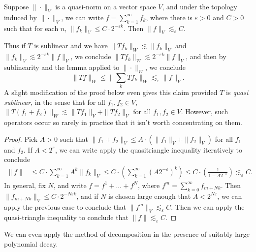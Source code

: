 \begin{lemma}
    Suppose $\| \cdot \|_V$ is a quasi-norm on a vector space $V$, and under the topology induced by $\| \cdot \|_V$, we can write $f = \sum_{k = 1}^\infty f_k$, where there is $\varepsilon > 0$ and $C > 0$ such that for each $n$, $\| f_k \|_V \leq C \cdot 2^{-\varepsilon k}$. Then $\| f \|_V \lesssim_\varepsilon C$.
\end{lemma}

\begin{remark}
	Thus if $T$ is sublinear and we have $\| Tf_k \|_W \lesssim \| f_k \|_V$ and $\| f_k \|_V \lesssim 2^{- \varepsilon k} \| f \|_V$, we conclude $\| Tf_k \|_W \lesssim 2^{-\varepsilon k} \| f \|_V$, and then by sublinearity and the lemma applied to $\| \cdot \|_W$, we conclude
	\[ \| Tf \|_W \leq \| \sum_k Tf_k \|_W \lesssim_\varepsilon \| f \|_V. \]
	A slight modification of the proof below even gives this claim provided $T$ is \emph{quasi sublinear}, in the sense that for all $f_1, f_2 \in V$, $\| T(f_1 + f_2) \|_W \lesssim \| Tf_1 \|_V + \| Tf_2 \|_V$ for all $f_1, f_2 \in V$. However, such operators occur so rarely in practice that it isn't worth concentrating on them.
\end{remark}

\begin{proof}
	Pick $A > 0$ such that $\| f_1 + f_2 \|_V \leq A \cdot (\| f_1 \|_V + \| f_2 \|_V)$ for all $f_1$ and $f_2$. If $A < 2^{\varepsilon}$, we can write apply the quasitriangle inequality iteratively to conclude
    \begin{align*}
        \| f \| &\leq C \cdot \sum_{k = 1}^\infty A^k \| f_k \|_V \leq C \cdot \left( \sum_{k = 1}^\infty (A 2^{-\varepsilon})^k \right) \leq C \cdot \left( \frac{1}{1 - A 2^{-\varepsilon}} \right) \lesssim_\varepsilon C.
    \end{align*}
    In general, fix $N$, and write $f = f^1 + \dots + f^N$, where $f^m = \sum_{k = 0}^\infty f_{m + Nk}$. Then $\| f_{m + Nk} \|_V \leq C \cdot 2^{- N \varepsilon k}$, and if $N$ is chosen large enough that $A < 2^{N \varepsilon}$, we can apply the previous case to conclude that $\| f^m \|_V \lesssim_\varepsilon C$. Then we can apply the quasi-triangle inequality to conclude that $\| f \| \lesssim_\varepsilon C$.
\end{proof}

We can even apply the method of decomposition in the presence of suitably large polynomial decay.

